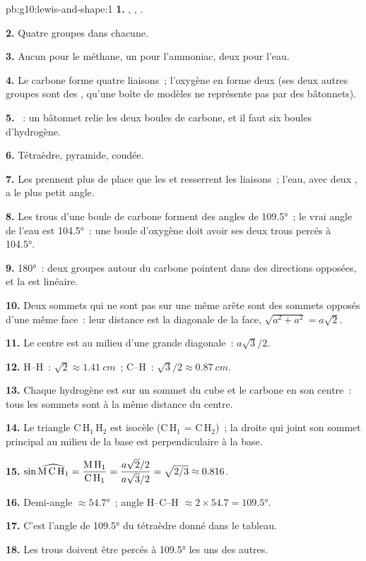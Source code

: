 \begin{solution}{pb:g10:lewis-and-shape:1}
\textbf{1.} , ,
.

\textbf{2.} Quatre groupes dans chacune.

\textbf{3.} Aucun pour le méthane, un pour l'ammoniac, deux pour l'eau.

\textbf{4.} Le carbone forme quatre liaisons~; l'oxygène en forme deux
(ses deux autres groupes sont des , qu'une boîte de
modèles ne représente pas par des bâtonnets).

\textbf{5.} ~: un bâtonnet
relie les deux boules de carbone, et il faut six boules d'hydrogène.

\textbf{6.} Tétraèdre, pyramide, coudée.

\textbf{7.} Les  prennent plus de place que les
 et resserrent les liaisons~; l'eau, avec deux , a le plus petit angle.

\textbf{8.} Les trous d'une boule de carbone forment des angles de
\ang{109.5}~; le vrai angle de l'eau est \ang{104.5}~: une boule
d'oxygène doit avoir ses deux trous percés à \ang{104.5}.

\textbf{9.} \ang{180}~: deux groupes autour du carbone pointent dans des
directions opposées, et la  est linéaire.

\textbf{10.} Deux sommets qui ne sont pas sur une même arête sont des
sommets opposés d'une même face~: leur distance est la diagonale de la
face, $\sqrt{a^2 + a^2} = a\sqrt{2}$.

\textbf{11.} Le centre est au milieu d'une grande diagonale~:
$a\sqrt{3}/2$.

\textbf{12.} H--H~: $\sqrt{2} \approx \qty{1.41}{cm}$~; C--H~:
$\sqrt{3}/2 \approx \qty{0.87}{cm}$.

\textbf{13.} Chaque hydrogène est sur un sommet du cube et le carbone en
son centre~: tous les sommets sont à la même distance du centre.

\textbf{14.} Le triangle C\,H$_1$\,H$_2$ est isocèle (C\,H$_1$ =
C\,H$_2$)~; la droite qui joint son sommet principal au milieu de la
base est perpendiculaire à la base.

\textbf{15.} $\sin \widehat{\text{M\,C\,H}_1} = \dfrac{\text{M\,H}_1}{\text{C\,H}_1}
= \dfrac{a\sqrt{2}/2}{a\sqrt{3}/2} = \sqrt{2/3} \approx 0.816$.

\textbf{16.} Demi-angle $\approx \ang{54.7}$~; angle H--C--H $\approx
2 \times 54.7 = \ang{109.5}$.

\textbf{17.} C'est l'angle de \ang{109.5} du tétraèdre donné dans le
tableau.

\textbf{18.} Les trous doivent être percés à \ang{109.5} les uns des
autres.
\end{solution}
